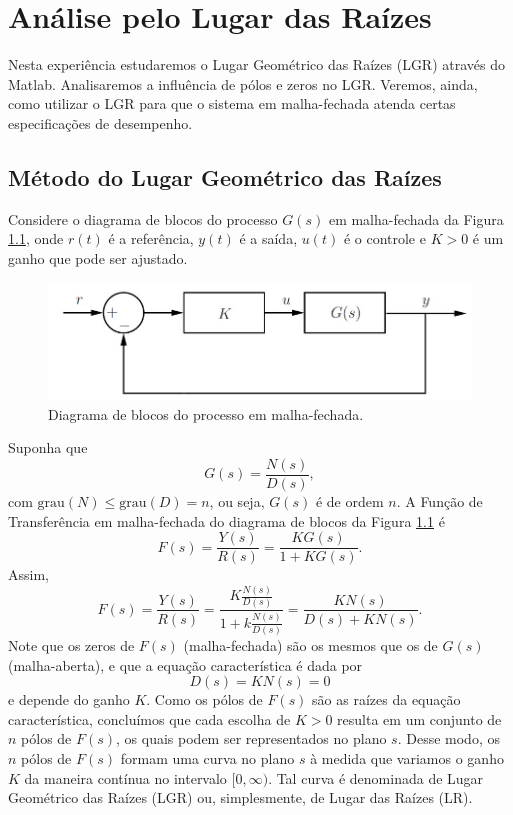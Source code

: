 \documentclass[
]{book}
\theoremstyle{definition}
\theoremstyle{definition}
\theoremstyle{definition}
\theoremstyle{remark}
\begin{document}
\hypertarget{lab8}{%
\chapter{Análise pelo Lugar das Raízes}\label{lab8}}

Nesta experiência estudaremos o Lugar Geométrico das Raízes (LGR) através do Matlab. Analisaremos a influência de pólos e zeros no LGR. Veremos, ainda, como utilizar o LGR para que o sistema em malha-fechada atenda certas especificações de desempenho.

\hypertarget{muxe9todo-do-lugar-geomuxe9trico-das-rauxedzes}{%
\section{Método do Lugar Geométrico das Raízes}\label{muxe9todo-do-lugar-geomuxe9trico-das-rauxedzes}}

Considere o diagrama de blocos do processo \(G(s)\) em malha-fechada da Figura \ref{fig:fig81}, onde \(r(t)\) é a referência, \(y(t)\) é a saída, \(u(t)\) é o controle e \(K>0\) é um ganho que pode ser ajustado.

\begin{figure}

{\centering \includegraphics[width=0.5\linewidth]{Imagens/Lab8/Apresentação/fig1} 

}

\caption{Diagrama de blocos do processo em malha-fechada.}\label{fig:fig81}
\end{figure}

Suponha que
\[
G(s) = \frac{N(s)}{D(s)},
\]
com \(\text{grau}(N) \leq \text{grau}(D) = n\), ou seja, \(G(s)\) é de ordem \(n\). A Função de Transferência em malha-fechada do diagrama de blocos da Figura \ref{fig:fig81} é
\[
F(s) = \frac{Y(s)}{R(s)} = \frac{KG(s)}{1 + KG(s)}.
\]
Assim,
\[
F(s) = \frac{Y(s)}{R(s)} = \frac{K\frac{N(s)}{D(s)}}{1+k\frac{N(s)}{D(s)}} = \frac{KN(s)}{D(s) + KN(s)}.
\]
Note que os zeros de \(F(s)\) (malha-fechada) são os mesmos que os de \(G(s)\) (malha-aberta), e que a equação característica é dada por
\[
D(s) = KN(s) = 0
\]
e depende do ganho \(K\). Como os pólos de \(F(s)\) são as raízes da equação característica, concluímos que cada escolha de \(K>0\) resulta em um conjunto de \(n\) pólos de \(F(s)\), os quais podem ser representados no plano \(s\). Desse modo, os \(n\) pólos de \(F(s)\) formam uma curva no plano \(s\) à medida que variamos o ganho \(K\) da maneira contínua no intervalo \([0,\infty)\). Tal curva é denominada de Lugar Geométrico das Raízes (LGR) ou, simplesmente, de Lugar das Raízes (LR).
\end{document}
